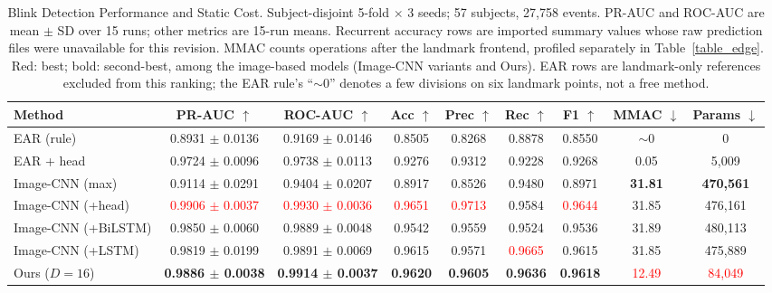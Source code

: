 \documentclass{IEEEmce}
\begin{document}
\begin{table}[!t]
\caption{Blink Detection Performance and Static Cost. Subject-disjoint 5-fold $\times$ 3
seeds; 57 subjects, 27{,}758 events. PR-AUC and ROC-AUC are mean $\pm$ SD over 15 runs;
other metrics are 15-run means. Recurrent accuracy rows are imported summary values
whose raw prediction files were unavailable for this revision. MMAC counts operations after the landmark frontend,
profiled separately in Table~\ref{table_edge}. Red: best; bold: second-best, among the
image-based models (Image-CNN variants and Ours). EAR rows are landmark-only references
excluded from this ranking; the EAR rule's ``$\sim$0'' denotes a few divisions on six
landmark points, not a free method.}
\label{table_main}
\centering
\normalsize
\renewcommand{\arraystretch}{0.9}
\setlength{\tabcolsep}{2pt}
\begin{tabular*}{\textwidth}{@{}l@{\extracolsep{\fill}}cccccccc@{}}
\hline\hline
Method & PR-AUC $\uparrow$ & ROC-AUC $\uparrow$ & Acc $\uparrow$ & Prec $\uparrow$ & Rec $\uparrow$ & F1 $\uparrow$ & MMAC $\downarrow$ & Params $\downarrow$\\
\hline
EAR (rule)              & 0.8931 $\pm$ 0.0136 & 0.9169 $\pm$ 0.0146 & 0.8505 & 0.8268 & 0.8878 & 0.8550 & $\sim$0 & 0\\
EAR + head              & 0.9724 $\pm$ 0.0096 & 0.9738 $\pm$ 0.0113 & 0.9276 & 0.9312 & 0.9228 & 0.9268 & 0.05 & 5{,}009\\
Image-CNN (max) \cite{daza2020} & 0.9114 $\pm$ 0.0291 & 0.9404 $\pm$ 0.0207 & 0.8917 & 0.8526 & 0.9480 & 0.8971 & \textbf{31.81} & \textbf{470{,}561}\\
Image-CNN (+head) & \textcolor{red}{0.9906 $\pm$ 0.0037} & \textcolor{red}{0.9930 $\pm$ 0.0036} & \textcolor{red}{0.9651} & \textcolor{red}{0.9713} & 0.9584 & \textcolor{red}{0.9644} & 31.85 & 476{,}161\\
Image-CNN (+BiLSTM)     & 0.9850 $\pm$ 0.0060 & 0.9889 $\pm$ 0.0048 & 0.9542 & 0.9559 & 0.9524 & 0.9536 & 31.89 & 480{,}113\\
Image-CNN (+LSTM)       & 0.9819 $\pm$ 0.0199 & 0.9891 $\pm$ 0.0069 & 0.9615 & 0.9571 & \textcolor{red}{0.9665} & 0.9615 & 31.85 & 475{,}889\\
Ours ($D=16$)  & \textbf{0.9886 $\pm$ 0.0038} & \textbf{0.9914 $\pm$ 0.0037} & \textbf{0.9620} & \textbf{0.9605} & \textbf{0.9636} & \textbf{0.9618} & \textcolor{red}{12.49} & \textcolor{red}{84{,}049}\\
\hline\hline
\end{tabular*}
\end{table}
\end{document}
